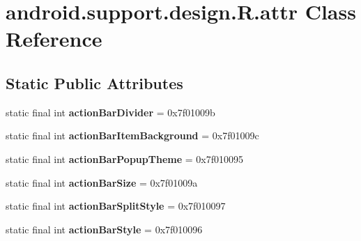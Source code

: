 \hypertarget{classandroid_1_1support_1_1design_1_1_r_1_1attr}{}\section{android.\+support.\+design.\+R.\+attr Class Reference}
\label{classandroid_1_1support_1_1design_1_1_r_1_1attr}
\subsection*{Static Public Attributes}
\begin{DoxyCompactItemize}
\item 
\hypertarget{classandroid_1_1support_1_1design_1_1_r_1_1attr_ae760bb3759dc75e0a49d12b13a525863}{}static final int {\bfseries action\+Bar\+Divider} = 0x7f01009b\label{classandroid_1_1support_1_1design_1_1_r_1_1attr_ae760bb3759dc75e0a49d12b13a525863}

\item 
\hypertarget{classandroid_1_1support_1_1design_1_1_r_1_1attr_a22428b19c7a60481d738d41421d2cae0}{}static final int {\bfseries action\+Bar\+Item\+Background} = 0x7f01009c\label{classandroid_1_1support_1_1design_1_1_r_1_1attr_a22428b19c7a60481d738d41421d2cae0}

\item 
\hypertarget{classandroid_1_1support_1_1design_1_1_r_1_1attr_a3099f3c0b99e3397da50683e55b24099}{}static final int {\bfseries action\+Bar\+Popup\+Theme} = 0x7f010095\label{classandroid_1_1support_1_1design_1_1_r_1_1attr_a3099f3c0b99e3397da50683e55b24099}

\item 
\hypertarget{classandroid_1_1support_1_1design_1_1_r_1_1attr_a3b80a59651b1b38d6c5497c22058009a}{}static final int {\bfseries action\+Bar\+Size} = 0x7f01009a\label{classandroid_1_1support_1_1design_1_1_r_1_1attr_a3b80a59651b1b38d6c5497c22058009a}

\item 
\hypertarget{classandroid_1_1support_1_1design_1_1_r_1_1attr_af3f9f00064ed4da503a855889da464de}{}static final int {\bfseries action\+Bar\+Split\+Style} = 0x7f010097\label{classandroid_1_1support_1_1design_1_1_r_1_1attr_af3f9f00064ed4da503a855889da464de}

\item 
\hypertarget{classandroid_1_1support_1_1design_1_1_r_1_1attr_afe4ac373c79d64575d48146ce16087f2}{}static final int {\bfseries action\+Bar\+Style} = 0x7f010096\label{classandroid_1_1support_1_1design_1_1_r_1_1attr_afe4ac373c79d64575d48146ce16087f2}


\end{DoxyCompactItemize}
